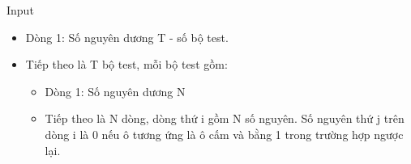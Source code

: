 Input  
\begin{itemize}
	\item     Dòng 1: Số nguyên dương T - số bộ test.   
	\item     Tiếp theo là T bộ test, mỗi bộ test gồm:    
\begin{itemize}
	\item       Dòng 1: Số nguyên dương N     
	\item       Tiếp theo là N dòng, dòng thứ i gồm N số nguyên. Số nguyên thứ j trên dòng i là 0 nếu ô tương ứng là ô cấm và bằng 1 trong trường hợp ngược lại.     
\end{itemize}
\end{itemize}
